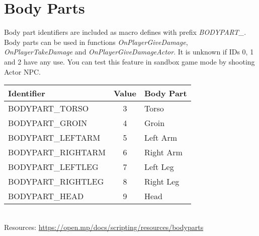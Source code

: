 \documentclass{article}
\begin{document}
\section{Body Parts}
\begin{sloppypar}
Body part identifiers are included as macro defines with prefix \textit{BODYPART\_}. Body parts can be used in functions \textit{OnPlayerGiveDamage}, \textit{OnPlayerTakeDamage} and \textit{OnPlayerGiveDamageActor}. It is unknown if IDs 0, 1 and 2 have any use. You can test this feature in sandbox game mode by shooting Actor NPC.
\end{sloppypar}
\bigskip
\noindent\begin{tabular}{ |l|c|l| } 
\hline
Identifier & Value & Body Part \\
\hline
BODYPART\_TORSO & 3 & Torso \\ 
BODYPART\_GROIN & 4 & Groin \\
BODYPART\_LEFTARM & 5 & Left Arm \\
BODYPART\_RIGHTARM & 6 & Right Arm \\
BODYPART\_LEFTLEG & 7 & Left Leg \\
BODYPART\_RIGHTLEG & 8 & Right Leg \\
BODYPART\_HEAD & 9 & Head \\
\hline
\end{tabular}
\bigskip
\\Resources: \url{https://open.mp/docs/scripting/resources/bodyparts}
\end{document}
